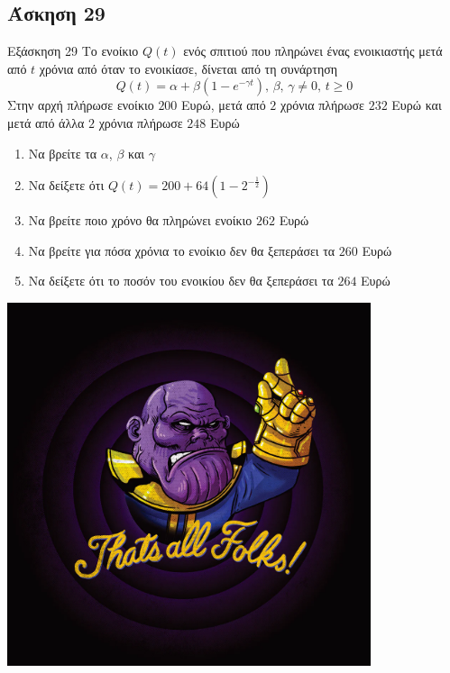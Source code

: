 \documentclass[greek]{beamer}
\begin{document}
\subsection{Άσκηση 29}
\begin{frame}[label=Άσκηση29,t]{Εξάσκηση 29}
 Το ενοίκιο $Q(t)$ ενός σπιτιού που πληρώνει ένας ενοικιαστής μετά από $t$ χρόνια από όταν το ενοικίασε, δίνεται από τη συνάρτηση
 $$Q(t)=α+β(1-e^{-γt}) \text{, } β \text{, } γ\ne 0\text{, } t\ge 0$$
 Στην αρχή πλήρωσε ενοίκιο $200$ Ευρώ, μετά από $2$ χρόνια πλήρωσε $232$ Ευρώ και μετά από άλλα $2$ χρόνια πλήρωσε $248$ Ευρώ
 \begin{enumerate}
  \item<1-> Να βρείτε τα $α$, $β$ και $γ$
  \item<2-> Να δείξετε ότι $Q(t)=200+64\left( 1-2^{-\frac{1}{2}} \right) $
  \item<3-> Να βρείτε ποιο χρόνο θα πληρώνει ενοίκιο $262$ Ευρώ
  \item<4-> Να βρείτε για πόσα χρόνια το ενοίκιο δεν θα ξεπεράσει τα $260$ Ευρώ
  \item<5-> Να δείξετε ότι το ποσόν του ενοικίου δεν θα ξεπεράσει τα $264$ Ευρώ
 \end{enumerate}

\end{frame}

\begin{frame}
\centering
\includegraphics[width=0.8\textwidth]{"./images/thatsall.png"}

\end{frame}
\end{document}

